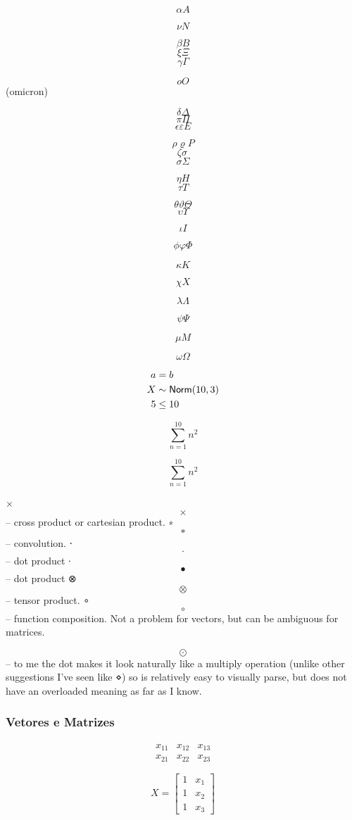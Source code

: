 \documentclass[
]{article}
\begin{document}
\[\alpha A\]

\[\nu N\]

\[\beta B\] \[\xi\Xi\] \[\gamma \Gamma\]

\[o O\] (omicron)

\[\delta \Delta\] \[\pi \Pi\] \[\epsilon \varepsilon E\]

\[\rho\varrho P\] \[\zeta \sigma \,\!\] \[\sigma \Sigma\]

\[\eta H\] \[\tau T\]

\[\theta \vartheta \Theta\] \[\upsilon \Upsilon\]

\[\iota I\]

\[\phi \varphi \Phi\]

\[\kappa K\]

\[\chi X\]

\[\lambda \Lambda\]

\[\psi \Psi\]

\[\mu M\]

\[\omega \Omega\]

\begin{align*}
a & = b \\
X &\sim {\sf Norm}(10, 3) \\
5 & \le 10
\end{align*}

\[\sum_{n=1}^{10} n^2\]

\[\sum_{n=1}^{10} n^2\]

× \[\times\] -- cross product or cartesian product. ∗ \[*\] --
convolution. ⋅ \[\cdot\] -- dot product ∙ \[\bullet\] -- dot product ⊗
\[\otimes\] -- tensor product. ∘ \[\circ\] -- function composition. Not
a problem for vectors, but can be ambiguous for matrices.

\[\odot\] -- to me the dot makes it look naturally like a multiply
operation (unlike other suggestions I've seen like ⋄) so is relatively
easy to visually parse, but does not have an overloaded meaning as far
as I know.

\subsubsection{Vetores e Matrizes}\label{vetores-e-matrizes}

\[\begin{array}{ccc}
x_{11} & x_{12} & x_{13}\\
x_{21} & x_{22} & x_{23}
\end{array}\]

\[X = \begin{bmatrix}1 & x_{1}\\
1 & x_{2}\\
1 & x_{3}
\end{bmatrix}\]
\end{document}
